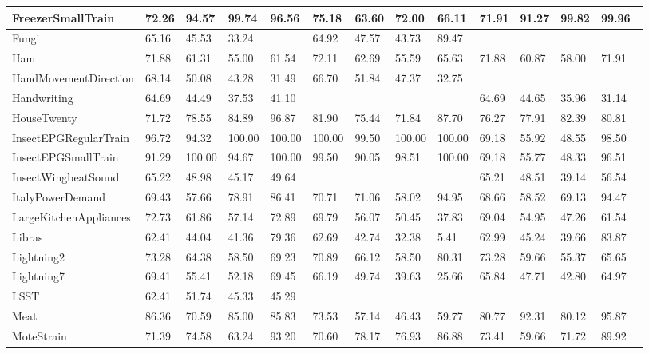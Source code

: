 \begin{landscape}
\begin{longtable}{|l|llll|llll|llll|}
      FreezerSmallTrain & 72.26 & 94.57 & 99.74 & 96.56 & 75.18 & 63.60 & 72.00 & 66.11 & 71.91 & 91.27 & 99.82 & 99.96 \\ \hline
      Fungi & 65.16 & 45.53 & 33.24 &   & 64.92 & 47.57 & 43.73 & 89.47 &   &   &   &   \\ \hline
      Ham & 71.88 & 61.31 & 55.00 & 61.54 & 72.11 & 62.69 & 55.59 & 65.63 & 71.88 & 60.87 & 58.00 & 71.91 \\ \hline
      HandMovementDirection & 68.14 & 50.08 & 43.28 & 31.49 & 66.70 & 51.84 & 47.37 & 32.75 &   &   &   &   \\ \hline
      Handwriting & 64.69 & 44.49 & 37.53 & 41.10 &   &   &   &   & 64.69 & 44.65 & 35.96 & 31.14 \\ \hline
      HouseTwenty & 71.72 & 78.55 & 84.89 & 96.87 & 81.90 & 75.44 & 71.84 & 87.70 & 76.27 & 77.91 & 82.39 & 80.81 \\ \hline
      InsectEPGRegularTrain & 96.72 & 94.32 & 100.00 & 100.00 & 100.00 & 99.50 & 100.00 & 100.00 & 69.18 & 55.92 & 48.55 & 98.50 \\ \hline
      InsectEPGSmallTrain & 91.29 & 100.00 & 94.67 & 100.00 & 99.50 & 90.05 & 98.51 & 100.00 & 69.18 & 55.77 & 48.33 & 96.51 \\ \hline
      InsectWingbeatSound & 65.22 & 48.98 & 45.17 & 49.64 &   &   &   &   & 65.21 & 48.51 & 39.14 & 56.54 \\ \hline
      ItalyPowerDemand & 69.43 & 57.66 & 78.91 & 86.41 & 70.71 & 71.06 & 58.02 & 94.95 & 68.66 & 58.52 & 69.13 & 94.47 \\ \hline
      LargeKitchenAppliances & 72.73 & 61.86 & 57.14 & 72.89 & 69.79 & 56.07 & 50.45 & 37.83 & 69.04 & 54.95 & 47.26 & 61.54 \\ \hline
      Libras & 62.41 & 44.04 & 41.36 & 79.36 & 62.69 & 42.74 & 32.38 & 5.41 & 62.99 & 45.24 & 39.66 & 83.87 \\ \hline
      Lightning2 & 73.28 & 64.38 & 58.50 & 69.23 & 70.89 & 66.12 & 58.50 & 80.31 & 73.28 & 59.66 & 55.37 & 65.65 \\ \hline
      Lightning7 & 69.41 & 55.41 & 52.18 & 69.45 & 66.19 & 49.74 & 39.63 & 25.66 & 65.84 & 47.71 & 42.80 & 64.97 \\ \hline
      LSST & 62.41 & 51.74 & 45.33 & 45.29 &   &   &   &   &   &   &   &   \\ \hline
      Meat & 86.36 & 70.59 & 85.00 & 85.83 & 73.53 & 57.14 & 46.43 & 59.77 & 80.77 & 92.31 & 80.12 & 95.87 \\ \hline
      MoteStrain & 71.39 & 74.58 & 63.24 & 93.20 & 70.60 & 78.17 & 76.93 & 86.88 & 73.41 & 59.66 & 71.72 & 89.92 \\ \hline

\end{longtable}
\end{landscape}
